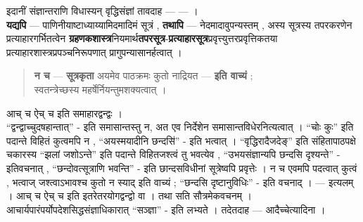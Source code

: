 इदानीं संज्ञान्तराणि विधास्यन् वृद्धिसंज्ञां तावदाह --- ---  ।\\
\textbf{यद्यपि} --- पाणिनीयाष्टाध्याय्यामिदमादिमं सूत्रं , \textbf{तथापि} --- नेदमादावुपन्यस्तम् , अस्य सूत्रस्य तपरकरणेन प्रत्याहारगर्भितत्वेन \textbf{ग्रहणकशास्त्र}नियमार्थ\textbf{तपरसूत्र}-\textbf{प्रत्याहारसूत्र}प्रवृत्त्युत्तरप्रवृत्तिकतया प्रत्याहारशास्त्रप्रपञ्चनिरूपणात् प्रागुपन्यासानर्हत्वात् ।
\begin{quote}
	\textbf{न च} --- \textbf{सूत्रकृता} अयमेव पाठक्रमः कुतो नाद्रियत --- \textbf{इति वाच्यं} ;\\
	स्वतन्त्रेच्छस्य महर्षेर्नियन्तुमशक्यत्वात् ।
\end{quote}

आच् च ऐच् च इति समाहारद्वन्द्वः ।\\
``द्वन्द्वाच्चुदषहान्तात्'' - इति समासान्तस्तु न, अत एव निर्देशेन
समासान्तविधेरनित्यत्वात् । ``चोः कुः'' इति पदान्ते विहितं कुत्वमपि न ,
``अयस्मयादीनि छन्दसि॑'' - इति भत्वात् । ``वृद्धिरादैजदेङ्'' इति
संहितापाठपक्षे चकारस्य ``झलां जशोऽन्ते'' इति पदान्ते विहितजश्त्वं तु
भवत्येव , ``उभयसंज्ञान्यपि छन्दसि दृश्यन्ते'' - इतिवचनात् ,
``छन्दोवत्सूत्राणि भवन्ति'' - इति छान्दसविधीनां सूत्रेष्वपि प्रवृत्तेः ।
न च एवमपि पदत्वात् कुत्वं , भत्वाज् जश्त्वाऽभावश्च कुतो न स्याद् इति
वाच्यं ; ``छन्दसि दृष्टानुविधिः'' - इति वचनाद् । --- इत्यलम् । आच् च ऐच्
च इति इतरेतरयोगद्वन्द्वो वा । तथा सति सौत्रमेकवचनम् ।
आचार्यपारंपर्योपदेशसिद्धसंज्ञाधिकारात् ``सञ्ज्ञा'' - इति लभ्यते ।
तदेतदाह --- आदैच्चेत्यादिना ।
